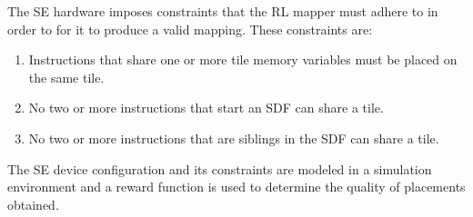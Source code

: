 The SE hardware imposes constraints that the RL mapper must adhere to in order to for it to produce a valid mapping. These constraints are:
\begin{enumerate}
  \item Instructions that share one or more tile memory variables must be placed on the same tile.
  \item No two or more instructions that start an SDF can share a tile.
  \item No two or more instructions that are siblings in the SDF can share a tile.
\end{enumerate}
The SE device configuration and its constraints are modeled in a simulation environment and a reward function is used to determine the quality of placements obtained.
